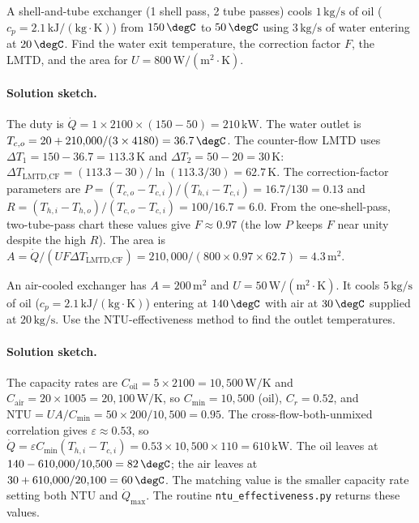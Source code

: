 \begin{exercise}
A shell-and-tube exchanger (1 shell pass, 2 tube passes) cools
$1\,\text{kg/s}$ of oil ($c_p = 2.1\,\text{kJ}/(\text{kg}\cdot\si{
\kelvin})$) from $150\,\degC$ to $50\,\degC$ using $3\,\text{kg/s}$ of
water entering at $20\,\degC$. Find the water exit temperature, the
correction factor $F$, the LMTD, and the area for $U = 800\,\text{W}/
(\text{m}^2\cdot\si{\kelvin})$.

\paragraph{Solution sketch.} The duty is $\dot{Q} = 1 \times 2100 \times
(150 - 50) = 210\,\text{kW}$. The water outlet is $T_{c,o} = 20 +
210{,}000/(3 \times 4180) = 36.7\,\degC$. The counter-flow LMTD uses
$\Delta T_1 = 150 - 36.7 = 113.3\,\si{\kelvin}$ and $\Delta T_2 = 50 -
20 = 30\,\si{\kelvin}$: $\Delta T_{\text{LMTD,CF}} = (113.3 -
30)/\ln(113.3/30) = 62.7\,\si{\kelvin}$. The correction-factor
parameters are $P = (T_{c,o} - T_{c,i})/(T_{h,i} - T_{c,i}) = 16.7/130
= 0.13$ and $R = (T_{h,i} - T_{h,o})/(T_{c,o} - T_{c,i}) = 100/16.7 =
6.0$. From the one-shell-pass, two-tube-pass chart these values give
$F \approx 0.97$ (the low $P$ keeps $F$ near unity despite the high
$R$). The area is $A = \dot{Q}/(U F \Delta T_{\text{LMTD,CF}}) =
210{,}000/(800 \times 0.97 \times 62.7) = 4.3\,\text{m}^2$.
\end{exercise}

\begin{exercise}
An air-cooled exchanger has $A = 200\,\text{m}^2$ and $U = 50\,
\text{W}/(\text{m}^2\cdot\si{\kelvin})$. It cools $5\,\text{kg/s}$ of
oil ($c_p = 2.1\,\text{kJ}/(\text{kg}\cdot\si{\kelvin})$) entering at
$140\,\degC$ with air at $30\,\degC$ supplied at $20\,\text{kg/s}$.
Use the NTU-effectiveness method to find the outlet temperatures.

\paragraph{Solution sketch.} The capacity rates are $C_{\text{oil}} = 5
\times 2100 = 10{,}500\,\si{\watt\per\kelvin}$ and $C_{\text{air}} = 20
\times 1005 = 20{,}100\,\si{\watt\per\kelvin}$, so $C_{\min} = 10{,}500$
(oil), $C_r = 0.52$, and $\text{NTU} = UA/C_{\min} = 50 \times
200/10{,}500 = 0.95$. The cross-flow-both-unmixed correlation gives
$\varepsilon \approx 0.53$, so $\dot{Q} = \varepsilon C_{\min}(T_{h,i}
- T_{c,i}) = 0.53 \times 10{,}500 \times 110 = 610\,\text{kW}$. The oil
leaves at $140 - 610{,}000/10{,}500 = 82\,\degC$; the air leaves at $30
+ 610{,}000/20{,}100 = 60\,\degC$. The matching value is the smaller
capacity rate setting both NTU and $\dot{Q}_{\max}$. The routine
\texttt{ntu\_effectiveness.py} returns these values.
\end{exercise}

